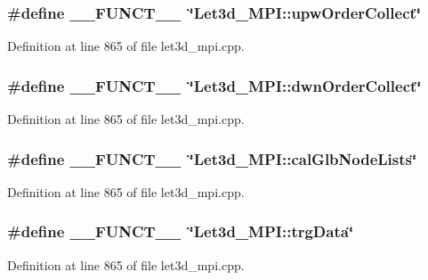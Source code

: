 \subsubsection{\setlength{\rightskip}{0pt plus 5cm}\#define \_\-\_\-FUNCT\_\-\_\-~\char`\"{}Let3d\_\-MPI::upw\-Order\-Collect\char`\"{}}\label{let3d__mpi_8cpp_2818853adf63a17949cf67d73c1d4473_2818853adf63a17949cf67d73c1d4473}




Definition at line 865 of file let3d\_\-mpi.cpp.
\subsubsection{\setlength{\rightskip}{0pt plus 5cm}\#define \_\-\_\-FUNCT\_\-\_\-~\char`\"{}Let3d\_\-MPI::dwn\-Order\-Collect\char`\"{}}\label{let3d__mpi_8cpp_2818853adf63a17949cf67d73c1d4473_2818853adf63a17949cf67d73c1d4473}




Definition at line 865 of file let3d\_\-mpi.cpp.
\subsubsection{\setlength{\rightskip}{0pt plus 5cm}\#define \_\-\_\-FUNCT\_\-\_\-~\char`\"{}Let3d\_\-MPI::cal\-Glb\-Node\-Lists\char`\"{}}\label{let3d__mpi_8cpp_2818853adf63a17949cf67d73c1d4473_2818853adf63a17949cf67d73c1d4473}




Definition at line 865 of file let3d\_\-mpi.cpp.
\subsubsection{\setlength{\rightskip}{0pt plus 5cm}\#define \_\-\_\-FUNCT\_\-\_\-~\char`\"{}Let3d\_\-MPI::trg\-Data\char`\"{}}\label{let3d__mpi_8cpp_2818853adf63a17949cf67d73c1d4473_2818853adf63a17949cf67d73c1d4473}




Definition at line 865 of file let3d\_\-mpi.cpp.
